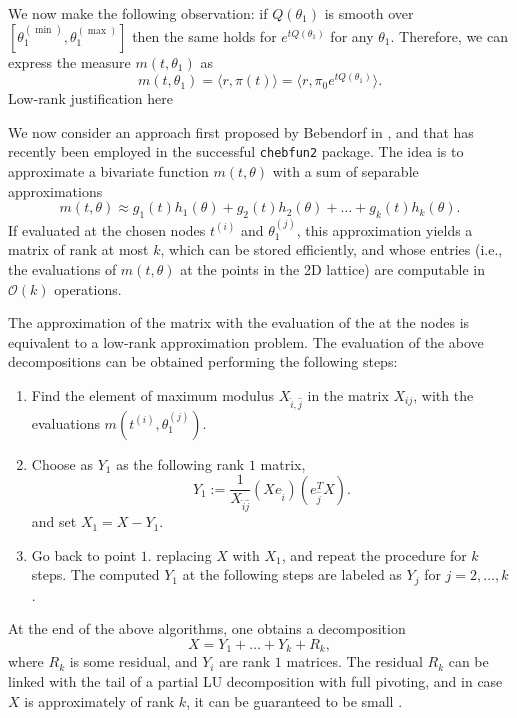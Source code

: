 \documentclass[]{article}
\begin{document}
We now make the following observation: if 
$Q(\theta_1)$ is smooth over $[\theta_1^{(\min)}, \theta_1^{(\max)}]$
then the same holds for $e^{tQ(\theta_1)}$ for any 
$\theta_1$. Therefore, we can express the measure 
$m(t, \theta_1)$ as 
\[
    m(t, \theta_1) = \langle r, \pi(t) \rangle = 
      \langle r, \pi_0 e^{tQ(\theta_1)} \rangle. 
\]
{ \color{red} Low-rank justification here }

We now consider an approach first proposed by Bebendorf 
in \cite{bebendorf2003adaptive}, and that has recently been employed in 
the successful \texttt{chebfun2} package. The idea is 
to approximate a bivariate function $m(t, \theta)$ with a 
sum of separable approximations
\[
    m(t, \theta) \approx 
      g_1(t) h_1(\theta) + g_2(t) h_2(\theta) + \ldots 
      + g_k(t) h_k(\theta). 
\]
If evaluated at the chosen nodes $t^{(i)}$ and 
$\theta_1^{(j)}$, this approximation yields a matrix 
of rank at most $k$, which can be stored efficiently, and 
whose entries (i.e., the evaluations of $m(t,\theta)$ at the 
points in the 2D lattice) are computable in $\mathcal O(k)$ 
operations. 

The approximation of the matrix with the  evaluation of the  
at the nodes is equivalent to a low-rank approximation 
problem. The evaluation of the above decompositions 
can be obtained performing the following 
steps:
\begin{enumerate}
    \item Find the element of maximum modulus  $X_{\hat i, \hat j}$
      in the matrix 
      $X_{ij}$, with the evaluations 
      $m(t^{(i)}, \theta_1^{(j)})$. 
    \item Choose as $Y_1$ as the following rank $1$ matrix,
      \[
          Y_1 := \frac{1}{X_{\hat i \hat j}} 
            (X e_{\hat i}) (e_{\hat j}^T X).
      \]
      and set $X_1 = X - Y_1$. 
    \item Go back to point $1.$ replacing $X$ with $X_1$, and repeat 
      the procedure for $k$ steps. The computed $Y_1$ at the following 
      steps are labeled as $Y_j$ for $j = 2, \ldots, k$. 
\end{enumerate}

At the end of the above algorithms, one obtains a decomposition 
\[
    X = Y_1 + \ldots + Y_k + R_k, 
\]
where $R_k$ is some residual, and $Y_i$ are rank $1$ matrices. The 
residual $R_k$ can be linked with the tail of a partial LU decomposition 
with full pivoting, and in case $X$ is approximately of rank $k$, 
it can be guaranteed to be small \cite{bebendorf2003adaptive,townsend2013extension}. 
\end{document}
